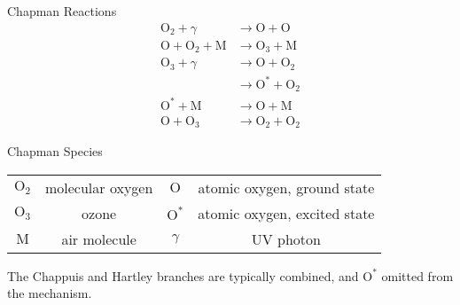 \vspace{-0.25in}
\begin{block}{Chapman Reactions}
\vspace{-0.2in}
\begin{align}
\mathrm{O_2} + \gamma &\rightarrow \mathrm{O}  + \mathrm{O} \tag*{molecular oxygen photolysis} \\
\mathrm{O} + \mathrm{O_2} + \mathrm{M} &\rightarrow \mathrm{O_3}  + \mathrm{M} \tag*{ozone creation} \\
\mathrm{O_3} + \gamma &\rightarrow \mathrm{O}  + \mathrm{O_2} \tag*{ozone photolysis (Chappuis)} \\
                      &\rightarrow \mathrm{O^*}  + \mathrm{O_2} \tag*{ozone photolysis (Hartley)} \\
\mathrm{O^*} + \mathrm{M} &\rightarrow \mathrm{O}  + \mathrm{M} \tag*{atomic oxygen quenching} \\
\mathrm{O} + \mathrm{O_3} &\rightarrow \mathrm{O_2}  + \mathrm{O_2} \tag*{ozone destruction}
\end{align}
\end{block}
\begin{block}{Chapman Species}
\begin{tabular}{|c|c||c|c|}
\hline
$\mathrm{O_2}$ & molecular oxygen
& $\mathrm{O}$ & atomic oxygen, ground state \\
$\mathrm{O_3}$ & ozone
& $\mathrm{O^*}$ & atomic oxygen, excited state \\
\hline
$\mathrm{M}$ & air molecule &
$\gamma$ & UV photon \\
\hline
\end{tabular}
\end{block}
\vspace{-0.05in}
{\small The Chappuis and Hartley branches are typically combined,
and $\mathrm{O^*}$ omitted from the mechanism.}

